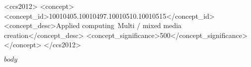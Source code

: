 \documentclass[sigconf,screen]{acmart}
\begin{document}
\begin{abstract}
$abstract$
\end{abstract}

\begin{CCSXML}
<ccs2012>
   <concept>
       <concept_id>10010405.10010497.10010510.10010515</concept_id>
       <concept_desc>Applied computing~Multi / mixed media creation</concept_desc>
       <concept_significance>500</concept_significance>
       </concept>
 </ccs2012>
\end{CCSXML}



%


\maketitle

$body$
\end{document}
